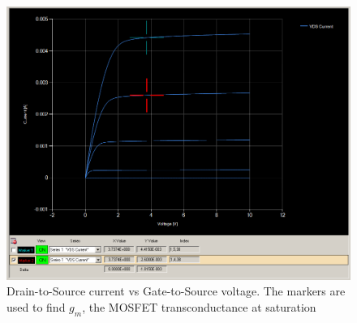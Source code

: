 \begin{figure}[ht]
    \centering
    \includegraphics[width=.95\linewidth]{figures/Graph_For_Output_TransCon.PNG}
    \caption{Drain-to-Source current vs Gate-to-Source voltage. The markers are used to find $g_m$, the MOSFET transconductance at saturation}
    \label{fig:VGS_constant}
\end{figure}